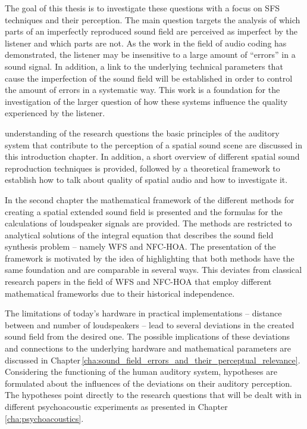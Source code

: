 The goal of this thesis is to investigate these questions with a focus on
\ac{SFS} techniques and their perception. The main question targets the analysis
of which parts of an imperfectly reproduced sound field are perceived as
imperfect
by the listener and which parts are not.
As the work in the field of audio coding has demonstrated, the listener
may be insensitive to a large amount of ``errors'' in a sound signal.
In addition, a link to the underlying
technical parameters that cause the imperfection of the sound field will be
established in order to control the amount of errors in a systematic way.
This work is a foundation for the investigation of the larger question of
how these systems influence the quality experienced by the listener.

 understanding of the research questions the basic
principles of the auditory system that contribute to the perception of a spatial
sound scene are discussed in this introduction chapter. In addition, a short
overview of different spatial sound reproduction techniques is provided,
followed by a theoretical framework to establish how to talk about quality of spatial
audio and how to investigate it.

In the second chapter the mathematical framework of the different methods for
creating a spatial extended sound field is presented and the formulas for
the calculations of loudspeaker signals are provided. The methods are restricted to
analytical solutions of the integral equation that describes the sound field
synthesis problem -- namely \ac{WFS} and \ac{NFC-HOA}. The presentation of the
framework is motivated by the idea of highlighting that both methods have the
same foundation and are comparable in several ways.\autocite[This idea is
developed in more detail in][]{Ahrens2012}
This deviates from classical
research papers in the field of \ac{WFS} and \ac{NFC-HOA} that employ
different mathematical frameworks due to their historical independence.

The limitations of today's hardware in practical implementations
-- distance between and number of
loudspeakers -- lead to several deviations in the created sound field from the
desired one. The possible implications of these deviations and connections to
the underlying hardware and mathematical parameters are discussed in
Chapter\,\ref{cha:sound_field_errors_and_their_perceptual_relevance}.
Considering the functioning of the human auditory system,
hypotheses are formulated about the influences of the deviations on their
auditory perception.
The hypotheses point directly to the research questions that will be dealt with
in different psychoacoustic experiments as presented in
Chapter\,\ref{cha:psychoacoustics}.


